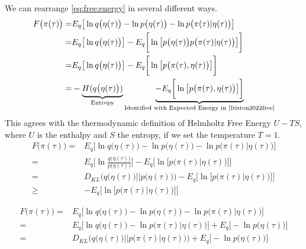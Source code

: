 \documentclass[]{article}
\begin{document}
We can rearrange \eqref{eq:free:energy} in several different ways.
\begin{align*}
	F\big(\pi(\tau)\big) =& E_q\big[\ln q\big(\eta(\tau)\big) - \ln p\big(\eta(\tau)\big) - \ln p\big(\pi(\tau)\vert\eta(\tau)\big)\big]\\
	=& E_q\big[\ln q\big(\eta(\tau)\big)\big] - E_q \bigg[\ln \big[p\big(\eta(\tau)\big)  p\big(\pi(\tau)\vert\eta(\tau)\big)\big]\bigg]\\
	=& E_q\big[\ln q\big(\eta(\tau)\big)\big] - E_q \bigg[\ln \big[  p\big(\pi(\tau),\eta(\tau)\big)\big]\bigg]\\
	=&-\underbrace{H(q\big(\eta(\tau)\big))}_\text{Entropy}  \underbrace{- E_q \bigg[\ln \big[  p\big(\pi(\tau),\eta(\tau)\big)\big]\bigg]}_\text{Identified with Expected Energy in \cite{friston2022free}}
\end{align*}
This agrees with the thermodynamic definition of Helmholtz Free Energy $U-TS$, where $U$ is the enthalpy and $S$ the entropy, if we set the temperature $T=1$.
\begin{align*}
	F\big(\pi(\tau)\big) =& E_q\big[\ln q\big(\eta(\tau)\big) - \ln p\big(\eta(\tau)\big) - \ln p\big(\pi(\tau)\vert\eta(\tau)\big)\big]\\
	=& E_q\big[\ln \frac{q\big(\eta(\tau)\big)}{p\big(\eta(\tau)\big)}   \big] - E_q \bigg[\ln \big[  p\big(\pi(\tau)\vert\eta(\tau)\big)\big]\bigg]\\
	=& D_{KL}\big(q\big(\eta(\tau)\big)\vert\vert p\big(\eta(\tau)\big)\big)- E_q \bigg[\ln \big[  p\big(\pi(\tau)\vert\eta(\tau)\big)\big]\bigg]\\
	\ge&- E_q \bigg[\ln \big[  p\big(\pi(\tau)\vert\eta(\tau)\big)\big]\bigg]
\end{align*}

\begin{align*}
	F\big(\pi(\tau)\big) =& E_q\big[\ln q\big(\eta(\tau)\big) - \ln p\big(\eta(\tau)\big) - \ln p\big(\pi(\tau)\vert\eta(\tau)\big)\big]\\
	=& E_q\big[\ln q\big(\eta(\tau)\big)  - \ln p\big(\pi(\tau)\vert\eta(\tau)\big)\big] +  E_q\big[- \ln p\big(\eta(\tau)\big)\big]\\
	=& D_{KL}\big(q\big(\eta(\tau)\big)\vert\vert p\big(\pi(\tau)\vert\eta(\tau)\big)\big)+  E_q\big[- \ln p\big(\eta(\tau)\big)\big]
\end{align*}
\end{document}
